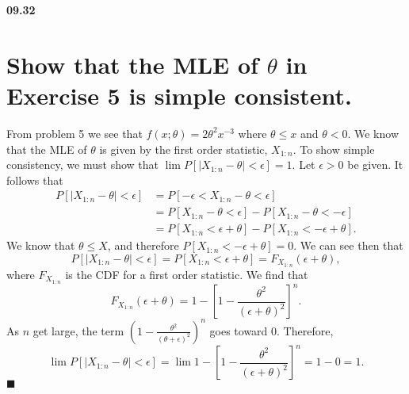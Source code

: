 {\bf 09.32}
\section*{Show that the MLE of $\theta$ in Exercise 5 is simple consistent.}

From problem 5 we see that $f(x ; \theta) = 2\theta^2x^{-3}$ where $\theta \leq x$ and $\theta < 0$. We know that the MLE of $\theta$ is given by the first order statistic, $X_{1:n}$. To show simple consistency, we must show that $\lim P[|X_{1:n} - \theta| < \epsilon] = 1.$ Let $\epsilon > 0$ be given. It follows that
\begin{align*}
P[|X_{1:n} - \theta| < \epsilon] &= P[ -\epsilon < X_{1:n} - \theta < \epsilon] \\
&= P[X_{1:n} - \theta < \epsilon] - P[X_{1:n} - \theta < -\epsilon] \\
&= P[X_{1:n} < \epsilon + \theta] - P[X_{1:n} < -\epsilon + \theta].
\end{align*} 
We know that $\theta \leq X$, and therefore $P[X_{1:n} < -\epsilon + \theta] = 0$. We can see then that $$P[|X_{1:n} - \theta | < \epsilon] = P[X_{1:n} < \epsilon + \theta] = F_{X_{1:n}}(\epsilon + \theta),$$ where $F_{X_{1:n}}$ is the CDF for a first order statistic. We find that $$F_{X_{1:n}}(\epsilon + \theta) = 1 - \left[1 - \frac{\theta^2}{(\epsilon + \theta)^2}\right]^n.$$ As $n$ get large, the term $\left( 1 - \frac{\theta^2}{(\theta + \epsilon)^2}\right)^n$ goes toward 0.
Therefore, $$\lim P[|X_{1:n} - \theta | < \epsilon] = \lim 1 - [1 - \frac{\theta^2}{(\epsilon + \theta)^2}]^n = 1 - 0 = 1.$$ $\blacksquare$